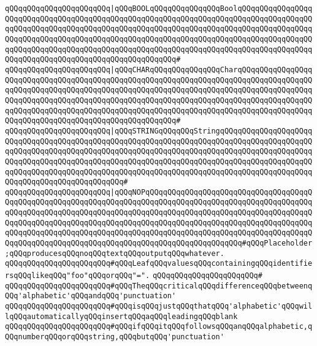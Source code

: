 \verb|qQQqqQQqqQQqqQQqqQQqqQQq|\verb#|qQQqBOOLqQQqqQQqqQQqqQQqBoolqQQqqQQqqQQqqQQqqQQqqQQqqQQqqQQqqQQqqQQqqQQqqQQqqQQqqQQqqQQqqQQqqQQqqQQqqQQqqQQqqQQqqQQqqQQqqQQqqQQqqQQqqQQqqQQqqQQqqQQqqQQqqQQqqQQqqQQqqQQqqQQqqQQqqQQqqQQqqQQqqQQqqQQqqQQqqQQqqQQqqQQqqQQqqQQqqQQqqQQqqQQqqQQqqQQqqQQqqQQqqQQqqQQqqQQqqQQqqQQqqQQqqQQqqQQqqQQqqQQqqQQqqQQqqQQqqQQqqQQqqQQqqQQqqQQqqQQqqQQqqQQqqQQqqQQqqQQqqQQqqQQqqQQqqQQqqQQq#\verb|#|\newline
\verb|qQQqqQQqqQQqqQQqqQQqqQQq|\verb#|qQQqCHARqQQqqQQqqQQqqQQqCharqQQqqQQqqQQqqQQqqQQqqQQqqQQqqQQqqQQqqQQqqQQqqQQqqQQqqQQqqQQqqQQqqQQqqQQqqQQqqQQqqQQqqQQqqQQqqQQqqQQqqQQqqQQqqQQqqQQqqQQqqQQqqQQqqQQqqQQqqQQqqQQqqQQqqQQqqQQqqQQqqQQqqQQqqQQqqQQqqQQqqQQqqQQqqQQqqQQqqQQqqQQqqQQqqQQqqQQqqQQqqQQqqQQqqQQqqQQqqQQqqQQqqQQqqQQqqQQqqQQqqQQqqQQqqQQqqQQqqQQqqQQqqQQqqQQqqQQqqQQqqQQqqQQqqQQqqQQqqQQqqQQqqQQqqQQqqQQq#\verb|#|\newline
\verb|qQQqqQQqqQQqqQQqqQQqqQQq|\verb#|qQQqSTRINGqQQqqQQqStringqQQqqQQqqQQqqQQqqQQqqQQqqQQqqQQqqQQqqQQqqQQqqQQqqQQqqQQqqQQqqQQqqQQqqQQqqQQqqQQqqQQqqQQqqQQqqQQqqQQqqQQqqQQqqQQqqQQqqQQqqQQqqQQqqQQqqQQqqQQqqQQqqQQqqQQqqQQqqQQqqQQqqQQqqQQqqQQqqQQqqQQqqQQqqQQqqQQqqQQqqQQqqQQqqQQqqQQqqQQqqQQqqQQqqQQqqQQqqQQqqQQqqQQqqQQqqQQqqQQqqQQqqQQqqQQqqQQqqQQqqQQqqQQqqQQqqQQqqQQqqQQqqQQqqQQqqQQqqQQqqQQqqQQq#\verb|#|\newline
\verb|qQQqqQQqqQQqqQQqqQQqqQQq|\verb#|qQQqNOPqQQqqQQqqQQqqQQqqQQqqQQqqQQqqQQqqQQqqQQqqQQqqQQqqQQqqQQqqQQqqQQqqQQqqQQqqQQqqQQqqQQqqQQqqQQqqQQqqQQqqQQqqQQqqQQqqQQqqQQqqQQqqQQqqQQqqQQqqQQqqQQqqQQqqQQqqQQqqQQqqQQqqQQqqQQqqQQqqQQqqQQqqQQqqQQqqQQqqQQqqQQqqQQqqQQqqQQqqQQqqQQqqQQqqQQqqQQqqQQqqQQqqQQqqQQqqQQqqQQqqQQqqQQqqQQqqQQqqQQqqQQqqQQqqQQqqQQqqQQqqQQqqQQqqQQqqQQqqQQqqQQqqQQqqQQqqQQqqQQqqQQqqQQqqQQqqQQqqQQqqQQqqQQqqQQq#\verb|#qQQqPlaceholder;qQQqproducesqQQqnoqQQqtextqQQqoutputqQQqwhatever.|\newline
\newline
\verb|qQQqqQQqqQQqqQQqqQQqqQQq#qQQqLeafqQQqvaluesqQQqcontainingqQQqidentifiersqQQqlikeqQQq"foo"qQQqorqQQq"=".|\newline
\verb|qQQqqQQqqQQqqQQqqQQqqQQq#|\newline
\verb|qQQqqQQqqQQqqQQqqQQqqQQq#qQQqTheqQQqcriticalqQQqdifferenceqQQqbetweenqQQq'alphabetic'qQQqandqQQq'punctuation'|\newline
\verb|qQQqqQQqqQQqqQQqqQQqqQQq#qQQqisqQQqjustqQQqthatqQQq'alphabetic'qQQqwillqQQqautomaticallyqQQqinsertqQQqaqQQqleadingqQQqblank|\newline
\verb|qQQqqQQqqQQqqQQqqQQqqQQq#qQQqifqQQqitqQQqfollowsqQQqanqQQqalphabetic,qQQqnumberqQQqorqQQqstring,qQQqbutqQQq'punctuation'|\newline
